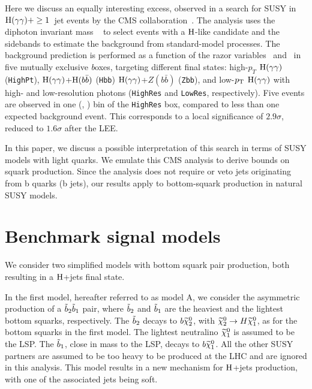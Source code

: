 Here we discuss an equally interesting excess, observed in a search
for SUSY in $\mathrm{H} (\gamma\gamma)+ \geq 1$~jet events by the CMS
collaboration~\cite{RazorHgaga}. The analysis uses the diphoton
invariant mass \mgaga~ to select events with a $\mathrm{H}$-like candidate
and the \mgaga~ sidebands to estimate the background from
standard-model processes. The background prediction is performed as a
function of the razor variables \MR~and \Rsq~in five mutually
exclusive {\textit boxes}, targeting different final states:
high-$p_T$ $\mathrm{H} (\gamma\gamma)$ (\texttt{HighPt}), $\mathrm{H}
(\gamma\gamma)$+$\mathrm{H} (b \bar b)$ (\texttt{Hbb}) $\mathrm{H}
(\gamma\gamma)$+$Z (b \bar b)$ (\texttt{Zbb}), and low-$p_{\mathrm{T}}$ $\mathrm{H}
(\gamma\gamma)$ with high- and low-resolution photons
(\texttt{HighRes} and \texttt{LowRes}, respectively). Five events are
observed in one (\MR, \Rsq) bin of the \texttt{HighRes} box, compared
to less than one expected background event. This corresponds to a
local significance of $2.9\sigma$, reduced to $1.6\sigma$ after the
LEE. 

In this paper, we discuss a possible interpretation of this search in
terms of SUSY models with light quarks. We emulate this CMS analysis
to derive bounds on squark production. Since the analysis does not
require or veto jets originating from b quarks (b jets), our results
apply to bottom-squark production in natural SUSY models. 

\section{Benchmark signal models}
\label{sec:models}

We consider two simplified models with bottom squark pair production, both
resulting in a $\mathrm{H}$+jets final state.

In the first model, hereafter referred to as model A, we consider the
asymmetric production of a $\tilde{b}_2
\tilde{b}_1$ pair, where $\tilde{b}_2$ and $\tilde{b}_1$ are the heaviest
and the lightest bottom squarks, respectively. The $\tilde{b}_2$ decays
to $b \widetilde{\chi}^{0}_2$, with $\widetilde{\chi}^{0}_2 \to H \widetilde{\chi}^{0}_1$, as for the bottom
squarks in the first model. The lightest neutralino $\widetilde{\chi}^{0}_1$ is
assumed to be the LSP. The $\tilde{b}_1$, close in mass to the LSP,
decays to $b \widetilde{\chi}^{0}_1$. All the other SUSY partners are assumed to be
too heavy to be produced at the LHC and are ignored in this
analysis. This model results in a new mechanism for
$\mathrm{H}$+jets production, with one of the associated jets being soft. 

